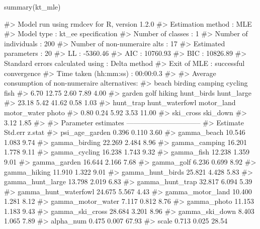 \begin{Schunk}
\begin{Sinput}
summary(kt_mle)
\end{Sinput}
\begin{Soutput}
#> Model run using rmdcev for R, version 1.2.0 
#> Estimation method                : MLE
#> Model type                       : kt_ee specification
#> Number of classes                : 1
#> Number of individuals            : 200
#> Number of non-numeraire alts     : 17
#> Estimated parameters             : 20
#> LL                               : -5360.46
#> AIC                              : 10760.93
#> BIC                              : 10826.89
#> Standard errors calculated using : Delta method
#> Exit of MLE                      : successful convergence
#> Time taken (hh:mm:ss)            : 00:00:0.3
#> 
#> Average consumption of non-numeraire alternatives:
#>          beach        birding        camping        cycling           fish 
#>           6.70          12.75           2.60           7.89           4.00 
#>         garden           golf         hiking     hunt_birds     hunt_large 
#>          23.18           5.42          41.62           0.58           1.03 
#>      hunt_trap hunt_waterfowl     motor_land    motor_water          photo 
#>           0.80           0.24           5.92           3.53          11.00 
#>      ski_cross       ski_down 
#>           3.12           1.85 
#> 
#> Parameter estimates --------------------------------  
#>                      Estimate Std.err z.stat
#> psi_age_garden          0.396   0.110   3.60
#> gamma_beach            10.546   1.083   9.74
#> gamma_birding          22.269   2.484   8.96
#> gamma_camping          16.201   1.778   9.11
#> gamma_cycling          16.238   1.743   9.32
#> gamma_fish             12.238   1.359   9.01
#> gamma_garden           16.644   2.166   7.68
#> gamma_golf              6.236   0.699   8.92
#> gamma_hiking           11.910   1.322   9.01
#> gamma_hunt_birds       25.821   4.428   5.83
#> gamma_hunt_large       13.798   2.019   6.83
#> gamma_hunt_trap        32.817   6.094   5.39
#> gamma_hunt_waterfowl   24.675   5.567   4.43
#> gamma_motor_land       10.400   1.281   8.12
#> gamma_motor_water       7.117   0.812   8.76
#> gamma_photo            11.153   1.183   9.43
#> gamma_ski_cross        28.684   3.201   8.96
#> gamma_ski_down          8.403   1.065   7.89
#> alpha_num               0.475   0.007  67.93
#> scale                   0.713   0.025  28.54
\end{Soutput}
\end{Schunk}

